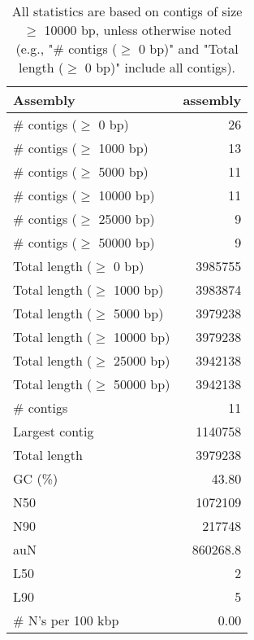 \documentclass[12pt,a4paper]{article}
\begin{document}
\begin{table}[ht]
\begin{center}
\caption{All statistics are based on contigs of size $\geq$ 10000 bp, unless otherwise noted (e.g., "\# contigs ($\geq$ 0 bp)" and "Total length ($\geq$ 0 bp)" include all contigs).}
\begin{tabular}{|l*{1}{|r}|}
\hline
Assembly & assembly \\ \hline
\# contigs ($\geq$ 0 bp) & 26 \\ \hline
\# contigs ($\geq$ 1000 bp) & 13 \\ \hline
\# contigs ($\geq$ 5000 bp) & 11 \\ \hline
\# contigs ($\geq$ 10000 bp) & 11 \\ \hline
\# contigs ($\geq$ 25000 bp) & 9 \\ \hline
\# contigs ($\geq$ 50000 bp) & 9 \\ \hline
Total length ($\geq$ 0 bp) & 3985755 \\ \hline
Total length ($\geq$ 1000 bp) & 3983874 \\ \hline
Total length ($\geq$ 5000 bp) & 3979238 \\ \hline
Total length ($\geq$ 10000 bp) & 3979238 \\ \hline
Total length ($\geq$ 25000 bp) & 3942138 \\ \hline
Total length ($\geq$ 50000 bp) & 3942138 \\ \hline
\# contigs & 11 \\ \hline
Largest contig & 1140758 \\ \hline
Total length & 3979238 \\ \hline
GC (\%) & 43.80 \\ \hline
N50 & 1072109 \\ \hline
N90 & 217748 \\ \hline
auN & 860268.8 \\ \hline
L50 & 2 \\ \hline
L90 & 5 \\ \hline
\# N's per 100 kbp & 0.00 \\ \hline
\end{tabular}
\end{center}
\end{table}
\end{document}
